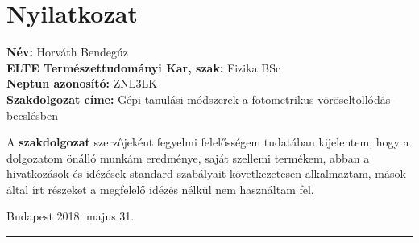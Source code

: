 \documentclass[12pt,letterpaper,oneside,openright]{book}
\begin{document}
\chapter*{Nyilatkozat}

\noindent
\textbf{Név:} Horváth Bendegúz
\\
\textbf{ELTE Természettudományi Kar, szak:} Fizika BSc
\\
\textbf{Neptun azonosító:} ZNL3LK\\
\textbf{Szakdolgozat címe:} Gépi tanulási módszerek a fotometrikus vöröseltollódás-becslésben
\vspace*{2cm}    

A    \textbf{szakdolgozat}   szerzőjeként    fegyelmi
felelősségem  tudatában kijelentem,  hogy a  dolgozatom  önálló munkám
eredménye, saját  szellemi termékem, abban a  hivatkozások és idézések
standard  szabályait  következetesen   alkalmaztam,  mások  által  írt
részeket a megfelelő idézés nélkül nem használtam fel.

\vspace*{2cm}
Budapest 2018. majus 31.
\\
\hspace*{8 cm}\rule{5cm}{0.5pt}
\end{document}
